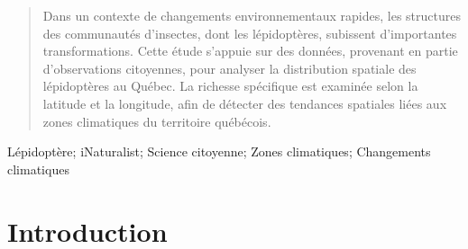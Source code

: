 \documentclass[conference,final,]{IEEEtran}
\begin{document}




\maketitle

\begin{abstract}
Dans un contexte de changements environnementaux rapides, les structures
des communautés d'insectes, dont les lépidoptères, subissent
d'importantes transformations. Cette étude s'appuie sur des données,
provenant en partie d'observations citoyennes, pour analyser la
distribution spatiale des lépidoptères au Québec. La richesse spécifique
est examinée selon la latitude et la longitude, afin de détecter des
tendances spatiales liées aux zones climatiques du territoire québécois.
\end{abstract}

\begin{IEEEkeywords}
Lépidoptère; iNaturalist; Science citoyenne; Zones
climatiques; Changements climatiques
\end{IEEEkeywords}




\maketitle


%
\IEEEpeerreviewmaketitle


\section{Introduction}\label{introduction}
\end{document}
